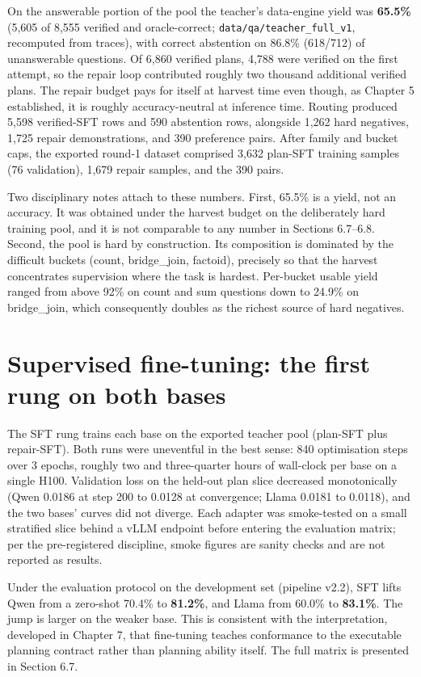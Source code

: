 On the answerable portion of the pool the teacher's data-engine yield was \textbf{65.5\%}
(5,605 of 8,555 verified and oracle-correct; \texttt{data/qa/teacher\_full\_v1}, recomputed from
traces), with correct abstention on 86.8\% (618/712) of unanswerable questions. Of 6,860
verified plans, 4,788 were verified on the first attempt, so the repair loop contributed
roughly two thousand additional verified plans. The repair budget pays for itself at harvest
time even though, as Chapter 5 established, it is roughly accuracy-neutral at inference time.
Routing produced 5,598 verified-SFT rows and 590 abstention rows, alongside 1,262 hard
negatives, 1,725 repair demonstrations, and 390 preference pairs. After family and bucket
caps, the exported round-1 dataset comprised 3,632 plan-SFT training samples (76 validation),
1,679 repair samples, and the 390 pairs.

Two disciplinary notes attach to these numbers. First, 65.5\% is a yield, not an accuracy. It
was obtained under the harvest budget on the deliberately hard training pool, and it is not
comparable to any number in Sections 6.7--6.8. Second, the pool is hard by construction. Its
composition is dominated by the difficult buckets (count, bridge\_join, factoid), precisely so
that the harvest concentrates supervision where the task is hardest. Per-bucket usable yield
ranged from above 92\% on count and sum questions down to 24.9\% on bridge\_join, which
consequently doubles as the richest source of hard negatives.

\section{Supervised fine-tuning: the first rung on both bases}\label{sec:supervised-fine-tuning-the-first-rung-on}

The SFT rung trains each base on the exported teacher pool (plan-SFT plus repair-SFT). Both
runs were uneventful in the best sense: 840 optimisation steps over 3 epochs, roughly two and
three-quarter hours of wall-clock per base on a single H100. Validation loss on the held-out
plan slice decreased monotonically (Qwen 0.0186 at step 200 to 0.0128 at convergence; Llama
0.0181 to 0.0118), and the two bases' curves did not diverge. Each adapter was smoke-tested on
a small stratified slice behind a vLLM endpoint before entering the evaluation matrix; per the
pre-registered discipline, smoke figures are sanity checks and are not reported as results.

Under the evaluation protocol on the development set (pipeline v2.2), SFT lifts Qwen from a
zero-shot 70.4\% to \textbf{81.2\%}, and Llama from 60.0\% to \textbf{83.1\%}. The jump is larger on the
weaker base. This is consistent with the interpretation, developed in Chapter 7, that
fine-tuning teaches conformance to the executable planning contract rather than planning
ability itself. The full matrix is presented in Section 6.7.

